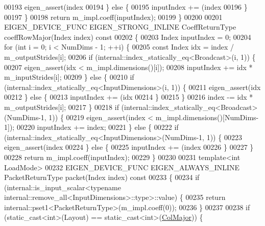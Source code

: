 \begin{DoxyCode}
00193         eigen\_assert(index %
00194       \} \textcolor{keywordflow}{else} \{
00195         inputIndex += (index %
00196       \}
00197     \}
00198     \textcolor{keywordflow}{return} m\_impl.coeff(inputIndex);
00199   \}
00200 
00201   EIGEN\_DEVICE\_FUNC EIGEN\_STRONG\_INLINE CoeffReturnType coeffRowMajor(Index index)\textcolor{keyword}{ const}
00202 \textcolor{keyword}{  }\{
00203     Index inputIndex = 0;
00204     \textcolor{keywordflow}{for} (\textcolor{keywordtype}{int} i = 0; i < NumDims - 1; ++i) \{
00205       \textcolor{keyword}{const} Index idx = index / m\_outputStrides[i];
00206       \textcolor{keywordflow}{if} (internal::index\_statically\_eq<Broadcast>(i, 1)) \{
00207         eigen\_assert(idx < m\_impl.dimensions()[i]);
00208         inputIndex += idx * m\_inputStrides[i];
00209       \} \textcolor{keywordflow}{else} \{
00210         \textcolor{keywordflow}{if} (internal::index\_statically\_eq<InputDimensions>(i, 1)) \{
00211           eigen\_assert(idx %
00212         \} \textcolor{keywordflow}{else} \{
00213           inputIndex += (idx %
00214         \}
00215       \}
00216       index -= idx * m\_outputStrides[i];
00217     \}
00218     \textcolor{keywordflow}{if} (internal::index\_statically\_eq<Broadcast>(NumDims-1, 1)) \{
00219       eigen\_assert(index < m\_impl.dimensions()[NumDims-1]);
00220       inputIndex += index;
00221     \} \textcolor{keywordflow}{else} \{
00222       \textcolor{keywordflow}{if} (internal::index\_statically\_eq<InputDimensions>(NumDims-1, 1)) \{
00223         eigen\_assert(index %
00224       \} \textcolor{keywordflow}{else} \{
00225         inputIndex += (index %
00226       \}
00227     \}
00228     \textcolor{keywordflow}{return} m\_impl.coeff(inputIndex);
00229   \}
00230 
00231   \textcolor{keyword}{template}<\textcolor{keywordtype}{int} LoadMode>
00232   EIGEN\_DEVICE\_FUNC EIGEN\_ALWAYS\_INLINE PacketReturnType packet(Index index)\textcolor{keyword}{ const}
00233 \textcolor{keyword}{  }\{
00234     \textcolor{keywordflow}{if} (internal::is\_input\_scalar<\textcolor{keyword}{typename} internal::remove\_all<InputDimensions>::type>::value) \{
00235       \textcolor{keywordflow}{return} internal::pset1<PacketReturnType>(m\_impl.coeff(0));
00236     \}
00237 
00238     \textcolor{keywordflow}{if} (static\_cast<int>(Layout) == \textcolor{keyword}{static\_cast<}\textcolor{keywordtype}{int}\textcolor{keyword}{>}(\hyperlink{group__enums_ggaacded1a18ae58b0f554751f6cdf9eb13a0cbd4bdd0abcfc0224c5fcb5e4f6669a}{ColMajor})) \{

\end{DoxyCode}
